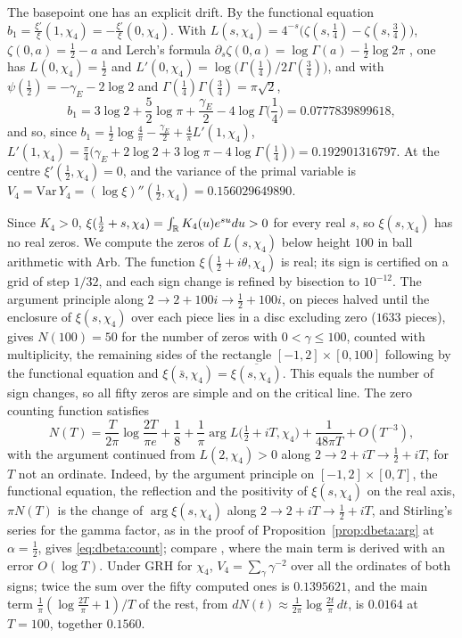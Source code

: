 The basepoint one has an explicit drift. By the functional equation $b_1=\frac{\xi'}\xi(1,\chi_4)=-\frac{\xi'}\xi(0,\chi_4)$. With $L(s,\chi_4)=4^{-s}\big(\zeta(s,\frac14)-\zeta(s,\frac34)\big)$, $\zeta(0,a)=\frac12-a$ and Lerch's formula $\partial_s\zeta(0,a)=\log\Gamma(a)-\frac12\log2\pi$ \cite[\S25.11]{DLMF}, one has $L(0,\chi_4)=\frac12$ and $L'(0,\chi_4)=\log\big(\Gamma(\frac14)/2\Gamma(\frac34)\big)$, and with $\psi(\frac12)=-\gamma_E-2\log2$ and $\Gamma(\frac14)\Gamma(\frac34)=\pi\sqrt2$,
\begin{equation}\label{eq:dbeta:b1}
b_1=3\log2+\frac52\log\pi+\frac{\gamma_E}2-4\log\Gamma\Big(\frac14\Big)=0.0777839899618,
\end{equation}
and so, since $b_1=\frac12\log\frac4\pi-\frac{\gamma_E}2+\frac4\pi L'(1,\chi_4)$, $L'(1,\chi_4)=\frac\pi4\big(\gamma_E+2\log2+3\log\pi-4\log\Gamma(\frac14)\big)=0.192901316797$. At the centre $\xi'(\frac12,\chi_4)=0$, and the variance of the primal variable is $V_4=\mathrm{Var}\,Y_4=(\log\xi)''(\frac12,\chi_4)=0.156029649890$.

Since $K_4>0$, $\xi(\frac12+s,\chi_4)=\int_{\mathbb{R}}K_4(u)e^{su}du>0$ for every real $s$, so $\xi(s,\chi_4)$ has no real zeros. We compute the zeros of $L(s,\chi_4)$ below height $100$ in ball arithmetic with Arb. The function $\xi(\frac12+i\theta,\chi_4)$ is real; its sign is certified on a grid of step $1/32$, and each sign change is refined by bisection to $10^{-12}$. The argument principle along $2\to2+100i\to\frac12+100i$, on pieces halved until the enclosure of $\xi(s,\chi_4)$ over each piece lies in a disc excluding zero ($1633$ pieces), gives $N(100)=50$ for the number of zeros with $0<\gamma\le100$, counted with multiplicity, the remaining sides of the rectangle $[-1,2]\times[0,100]$ following by the functional equation and $\xi(\bar s,\chi_4)=\overline{\xi(s,\chi_4)}$. This equals the number of sign changes, so all fifty zeros are simple and on the critical line. The zero counting function satisfies
\begin{equation}\label{eq:dbeta:count}
N(T)=\frac T{2\pi}\log\frac{2T}{\pi e}+\frac18+\frac1\pi\arg L\big(\tfrac12+iT,\chi_4\big)+\frac1{48\pi T}+O(T^{-3}),
\end{equation}
with the argument continued from $L(2,\chi_4)>0$ along $2\to2+iT\to\frac12+iT$, for $T$ not an ordinate. Indeed, by the argument principle on $[-1,2]\times[0,T]$, the functional equation, the reflection and the positivity of $\xi(s,\chi_4)$ on the real axis, $\pi N(T)$ is the change of $\arg\xi(s,\chi_4)$ along $2\to2+iT\to\frac12+iT$, and Stirling's series \cite[\S5.11]{DLMF} for the gamma factor, as in the proof of Proposition~\ref{prop:dbeta:arg} at $\alpha=\frac12$, gives \eqref{eq:dbeta:count}; compare \cite[Chapter 16]{Davenport}, where the main term is derived with an error $O(\log T)$. Under GRH for $\chi_4$, $V_4=\sum_\gamma\gamma^{-2}$ over all the ordinates of both signs; twice the sum over the fifty computed ones is $0.1395621$, and the main term $\frac1\pi(\log\frac{2T}\pi+1)/T$ of the rest, from $dN(t)\approx\frac1{2\pi}\log\frac{2t}\pi\,dt$, is $0.0164$ at $T=100$, together $0.1560$.

